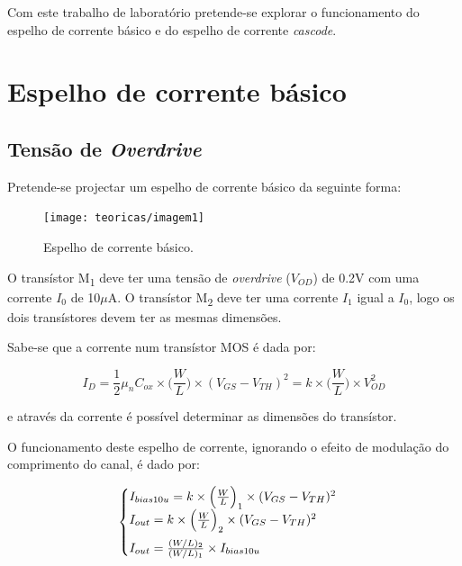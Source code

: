 \documentclass[11pt]{article}
\numberwithin{equation}{section}
\begin{document}
Com este trabalho de laboratório pretende-se explorar o funcionamento do espelho de corrente básico e do espelho de corrente \textit{cascode}.

\pagebreak

\section{Espelho de corrente básico}
\subsection{Tensão de \textit{Overdrive}}

Pretende-se projectar um espelho de corrente básico da seguinte forma:

\begin{figure}[h]
	\centering
	\texttt{[image: teoricas/imagem1]}
	\vspace{-0.8em}
	\caption{Espelho de corrente básico.}
	\vspace{-0.8em}
\end{figure} 

O transístor M\textsubscript{1} deve ter uma tensão de \textit{overdrive} ($V_{OD}$) de 0.2V com uma corrente $I_{0}$ de 10$\mu$A. O transístor M\textsubscript{2} deve ter uma corrente $I_{1}$ igual a $I_{0}$, logo os dois transístores devem ter as mesmas dimensões.

Sabe-se que a corrente num transístor MOS é dada por:

\vspace{-3mm}
\begin{equation}
I_{D} = \frac{1}{2}\mu_{n}C_{ox}\times \Big(\frac{W}{L}\Big) \times(V_{GS}-V_{TH})^2 = k\times \Big(\frac{W}{L}\Big) \times V_{OD}^2
\label{eq:corrente}
\end{equation}

\vspace{1mm}
e através da corrente é possível determinar as dimensões do transístor. 

O funcionamento deste espelho de corrente, ignorando o efeito de modulação do comprimento do canal, é dado por:

\begin{equation}
\begin{cases}I_{bias10u} = k\times \Big(\frac{W}{L}\Big)_{1} \times(V_{GS}-V_{TH})^2 \\ I_{out} = k\times \Big(\frac{W}{L}\Big)_{2} \times(V_{GS}-V_{TH})^2 \vspace{2mm} \\ I_{out} = \frac{({W}/{L})_{2}}{({W}/{L})_{1}} \times I_{bias10u} \end{cases}
\end{equation}
\end{document}
